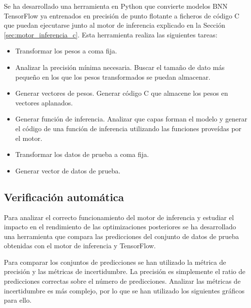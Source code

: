 Se ha desarrollado una herramienta en Python que convierte modelos BNN TensorFlow ya entrenados en precisión de punto flotante a ficheros de código C que puedan ejecutarse junto al motor de inferencia explicado en la Sección \ref{sec:motor_inferencia_c}. Esta herramienta realiza las siguientes tareas:

\begin{itemize}
    \item Transformar los pesos a coma fija.
    \item Analizar la precisión mínima necesaria. Buscar el tamaño de dato más pequeño en los que los pesos transformados se puedan almacenar. \todo
    \item Generar vectores de pesos. Generar código C que almacene los pesos en vectores aplanados.
    \item Generar función de inferencia. Analizar que capas forman el modelo y generar el código de una función de inferencia utilizando las funciones proveídas por el motor.
    \item Transformar los datos de prueba a coma fija.
    \item Generar vector de datos de prueba.
\end{itemize}

\subsection{Verificación automática}

Para analizar el correcto funcionamiento del motor de inferencia y estudiar el impacto en el rendimiento de las optimizaciones posteriores se ha desarrollado una herramienta que compara las predicciones del conjunto de datos de prueba obtenidas con el motor de inferencia y TensorFlow.

Para comparar los conjuntos de predicciones se han utilizado la métrica de precisión y las métricas de incertidumbre. La precisión es simplemente el ratio de predicciones correctas sobre el número de predicciones. Analizar las métricas de incertidumbre es más complejo, por lo que se han utilizado los siguientes gráficos para ello.\\


